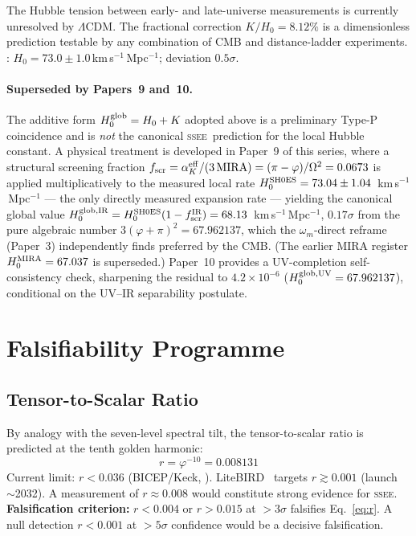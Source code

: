 \documentclass[12pt,a4paper]{article}
\newcommand{\SSEE}{\ifmmode\mathrm{SSEE}\else\textsc{ssee}\fi}
\begin{document}
The Hubble tension between early- and late-universe measurements
\citep{Verde2019,Kamionkowski2023} is currently unresolved by $\Lambda$CDM.
The fractional correction $K/H_0 = 8.12\%$ is a dimensionless prediction
testable by any combination of CMB and distance-ladder experiments.
\citet{Riess2022}: $H_0 = 73.0\pm1.0$\,km\,s$^{-1}$\,Mpc$^{-1}$; deviation $0.5\sigma$.

\paragraph{Superseded by Papers~9 and~10.}
The additive form $H_0^{\rm glob} = H_0 + K$ adopted above is a preliminary
Type-P coincidence and is \emph{not} the canonical \SSEE\ prediction for the
local Hubble constant. A physical treatment is developed in Paper~9 of this
series, where a structural screening fraction
$f_{\rm scr} = \alpha_K^{\rm eff}/(3\,\mathrm{MIRA}) = (\pi-\varphi)/\Omega^2 = 0.0673$
is applied multiplicatively to the measured local rate
$H_0^{\rm SH0ES}=73.04\pm1.04$~km\,s$^{-1}$\,Mpc$^{-1}$ \citep{Riess2022} ---
the only directly measured expansion rate --- yielding the canonical global value
$H_0^{\rm glob,IR} = H_0^{\rm SH0ES}(1-f_{\rm scr}^{\rm IR}) = 68.13$~km\,s$^{-1}$\,Mpc$^{-1}$,
$0.17\sigma$ from the pure algebraic number $3(\varphi+\pi)^2=67.962137$, which
the $\omega_m$-direct reframe (Paper~3) independently finds preferred by the
CMB. (The earlier MIRA register $H_0^{\rm MIRA}=67.037$ is superseded.)
Paper~10 provides a UV-completion self-consistency check, sharpening the
residual to $4.2\times10^{-6}$ ($H_0^{\rm glob,UV} = 67.962137$),
conditional on the UV--IR separability postulate.

\section{Falsifiability Programme}
\label{sec:falsifiability}

\subsection{Tensor-to-Scalar Ratio}
\label{sec:r}

By analogy with the seven-level spectral tilt, the tensor-to-scalar ratio is
predicted at the tenth golden harmonic:
\begin{equation}
\boxed{r = \varphi^{-10} = 0.008131}
\label{eq:r}
\end{equation}
Current limit: $r<0.036$ (BICEP/Keck, \citep{BICEPKeck2021}).
LiteBIRD~\citep{LiteBIRD2023} targets $r\gtrsim0.001$ (launch~$\sim$2032).
A measurement of $r\approx0.008$ would constitute strong evidence for \SSEE.
\textbf{Falsification criterion:} $r < 0.004$ or $r > 0.015$ at $>3\sigma$ falsifies Eq.~\eqref{eq:r}.
A null detection $r<0.001$ at $>5\sigma$ confidence would be a decisive falsification.
\end{document}
